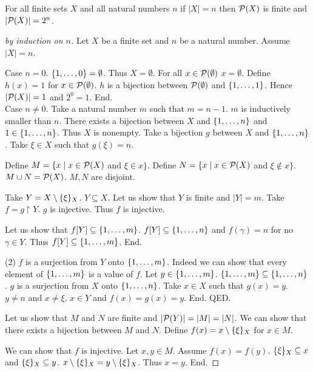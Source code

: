 \documentclass{article}
\begin{document}
  \begin{forthel}
  
  \begin{theorem}
  For all finite sets $X$ and all natural numbers $n$ if $|X| = n$ then
  ${\cal P}(X)$ is finite and $|{\cal P}(X)| = 2^{n}$.
  \end{theorem}
  \begin{proof}[by induction on $n$]
  Let $X$ be a finite set and $n$ be a natural number. Assume $|X| = n$.
  
  Case $n = 0$. $\{1,\dots,0\} = \emptyset$. Thus $X = \emptyset$. 
    For all $x \in {\cal P}(\emptyset)$ $x = \emptyset$. 
    Define $h(x) = 1$ for $x \in {\cal P}(\emptyset)$. 
    $h$ is a bijection between ${\cal P}(\emptyset)$ and $\{1,\dots,1\}$.
    Hence $|{\cal P}(X)| = 1$ and $2^{0} = 1$. End.\\
  
  Case $n \neq 0$. Take a natural number $m$ such that $m = n - 1$. $m$ is inductively smaller than $n$.
    There exists a bijection between $X$ and $\{1,\dots,n\}$ and $1 \in \{1,\dots,n\}$. Thus $X$ is nonempty.
    Take a bijection $g$ between $X$ and $\{1,\dots,n\}$. Take $\xi \in X$ such that $g(\xi) = n$.
  
    Define $M = \{x \mid x \in {\cal P}(X)$ and $\xi \in x\}$. Define $N = \{x \mid x \in {\cal P}(X)$ and $\xi \notin x\}$.
    $M \cup N = {\cal P}(X)$. $M,N$ are disjoint.
  
    Take $Y = X \setminus \{\xi\}_{X}$. $Y \subseteq X$.
    Let us show that $Y$ is finite and $|Y| = m$.
      Take $f = g \upharpoonright Y$.
      $g$ is injective. Thus $f$ is injective.
  
      Let us show that $f[Y] \subseteq \{1,\dots,m\}$.
        $f[Y] \subseteq \{1,\dots,n\}$ and $f(\gamma) = n$ for no $\gamma \in Y$.
        Thus $f[Y] \subseteq \{1,\dots,m\}$. End.
  
      (2) $f$ is a surjection from $Y$ onto $\{1,\dots,m\}$.
      Indeed we can show that every element of $\{1,\dots,m\}$ is a value of $f$.
        Let $y \in \{1,\dots,m\}$. $\{1,\dots,m\} \subseteq \{1,\dots,n\}$. $g$ is a surjection from $X$ onto $\{1,\dots,n\}$.
        Take $x \in X$ such that $g(x) = y$. $y \neq n$ and $x \neq \xi$. $x \in Y$ and $f(x) = g(x) = y$. End.
    QED.
  
  
    Let us show that $M$ and $N$ are finite and $|{\cal P}(Y)| = |M| = |N|$.
      We can show that there exists a bijection between $M$ and $N$.
        Define $f(x) = x \setminus \{\xi\}_{X}$ for $x \in M$.
    
        We can show that $f$ is injective.
          Let $x,y \in M$. Assume $f(x) = f(y)$. $\{\xi\}_{X} \subseteq x$ and $\{\xi\}_{X} \subseteq y$.
          $x \setminus \{\xi\}_{X} = y \setminus \{\xi\}_{X}$. Thus $x = y$. End.
    

\end{proof}
\end{forthel}
\end{document}
